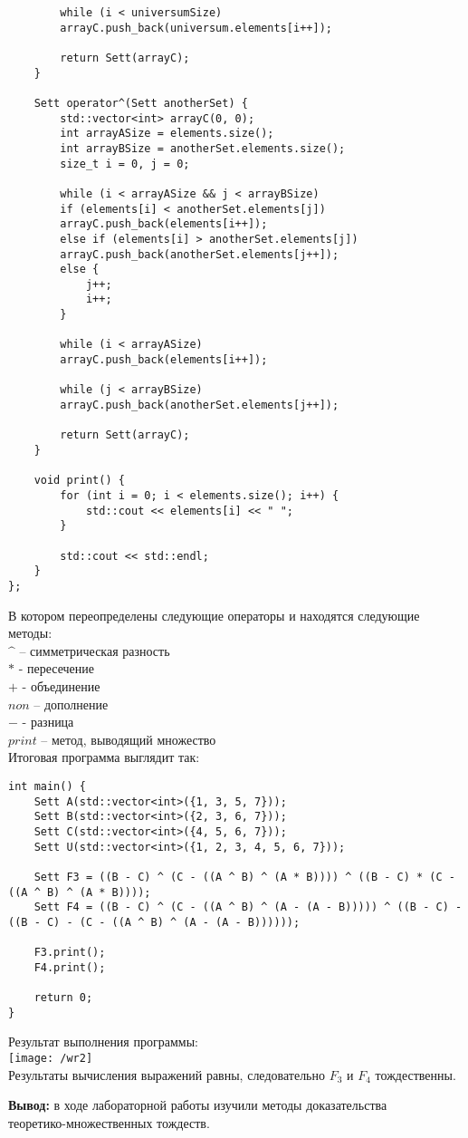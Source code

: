 \documentclass[a4paper,14pt]{extarticle}
\begin{document}
\begin{enumerate}[№1. ]
\begin{verbatim}
		while (i < universumSize)
		arrayC.push_back(universum.elements[i++]);
		
		return Sett(arrayC);
	}
	
	Sett operator^(Sett anotherSet) {
		std::vector<int> arrayC(0, 0);
		int arrayASize = elements.size();
		int arrayBSize = anotherSet.elements.size();
		size_t i = 0, j = 0;
		
		while (i < arrayASize && j < arrayBSize)
		if (elements[i] < anotherSet.elements[j])
		arrayC.push_back(elements[i++]);
		else if (elements[i] > anotherSet.elements[j])
		arrayC.push_back(anotherSet.elements[j++]);
		else {
			j++;
			i++;
		}
		
		while (i < arrayASize)
		arrayC.push_back(elements[i++]);
		
		while (j < arrayBSize)
		arrayC.push_back(anotherSet.elements[j++]);
		
		return Sett(arrayC);
	}
	
	void print() {
		for (int i = 0; i < elements.size(); i++) {
			std::cout << elements[i] << " ";
		}
		
		std::cout << std::endl;
	}
};
\end{verbatim}
В котором переопределены следующие операторы и находятся следующие методы:\\
$\^$ – симметрическая разность\\
$*$ - пересечение\\
$+$ - объединение\\
$non$ – дополнение\\
$-$ - разница\\
$print$ – метод, выводящий множество\\
Итоговая программа выглядит так:\\
\begin{verbatim}
int main() {
	Sett A(std::vector<int>({1, 3, 5, 7}));
	Sett B(std::vector<int>({2, 3, 6, 7}));
	Sett C(std::vector<int>({4, 5, 6, 7}));
	Sett U(std::vector<int>({1, 2, 3, 4, 5, 6, 7}));
	
	Sett F3 = ((B - C) ^ (C - ((A ^ B) ^ (A * B)))) ^ ((B - C) * (C - ((A ^ B) ^ (A * B))));
	Sett F4 = ((B - C) ^ (C - ((A ^ B) ^ (A - (A - B))))) ^ ((B - C) - ((B - C) - (C - ((A ^ B) ^ (A - (A - B))))));
	
	F3.print();
	F4.print();
	
	return 0;
}
\end{verbatim}

Результат выполнения программы:\\
\texttt{[image: /wr2]}\\
Результаты вычисления выражений равны, следовательно $F_3$ и $F_4$ тождественны.
	\end{enumerate}
			\textbf{Вывод: } в ходе лабораторной работы изучили методы доказательства \\теоретико-множественных тождеств.
\end{document}
